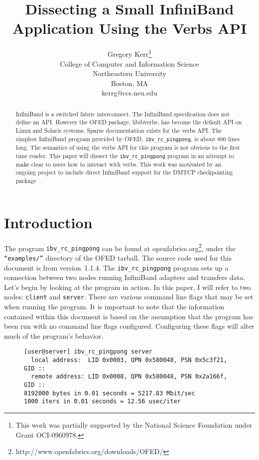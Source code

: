 \documentclass[letterpaper,12pt]{article}
\title{Dissecting a Small InfiniBand Application Using the Verbs API}
\author{Gregory Kerr\thanks{This work was partially supported by the
National Science Foundation under Grant OCI-0960978.} \\ College of
Computer and Information Science \\ Northeastern University \\ Boston,
MA \\ kerrg@ccs.neu.edu }
\date{}
\begin{document}
\maketitle

\begin{abstract}
InfiniBand is a switched fabric interconnect. The InfiniBand specification
does not define an API. However the OFED package, libibverbs, has become
the default API on Linux and Solaris systems.  Sparse documentation exists
for the verbs API. The simplest InfiniBand program provided by OFED,
{\tt ibv\_rc\_pingpong}, is about 800 lines long.  The semantics of using
the verbs API for this program is not obvious to the first time reader.
This paper will dissect the {\tt ibv\_rc\_pingpong} program in an attempt
to make clear to users how to interact with verbs. This work was motivated
by an ongoing project to include direct InfiniBand support for the DMTCP
checkpointing package~\cite{DMTCP}.
\end{abstract}

\section{Introduction}

The program {\tt ibv\_rc\_pingpong} can be found at
openfabrics.org\footnote{http://www.openfabrics.org/downloads/OFED/},
under the {\tt ``examples/''} directory of the OFED tarball. The source code
used for this document is from version~1.1.4. The {\tt ibv\_rc\_pingpong}
program
sets up a connection between two nodes running InfiniBand adapters
and transfers data.  Let's begin by looking at the program in action. In
this paper, I will refer to two nodes: {\tt client} and {\tt server}. There are
various command line flags that may be set when running the program. It is important
to note that the information contained within this document is based
on the assumption that the program has been run with no command line
flags configured. Configuring these flags will alter much of the program's behavior.

\begin{figure}
\begin{verbatim}
[user@server] ibv_rc_pingpong server
  local address:  LID 0x0003, QPN 0x580048, PSN 0x5c3f21, GID ::
  remote address: LID 0x0008, QPN 0x580048, PSN 0x2a166f, GID ::
8192000 bytes in 0.01 seconds = 5217.83 Mbit/sec
1000 iters in 0.01 seconds = 12.56 usec/iter
\end{verbatim}
\end{figure}
\end{document}
